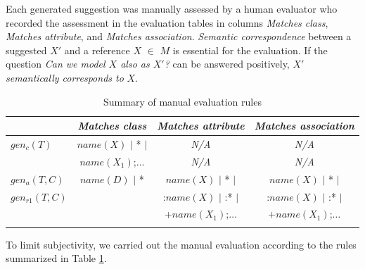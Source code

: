 Each generated suggestion was manually assessed by a human evaluator who recorded the assessment in the evaluation tables in columns \emph{Matches class}, \emph{Matches attribute}, and \emph{Matches association}.
\emph{Semantic correspondence} between a suggested $X'$ and a reference $X$ $\in$ $M$ is essential for the evaluation.
If the question \emph{Can we model $X$ also as $X'$?} can be answered positively, $X'$ \emph{semantically corresponds to} $X$.

\begin{table}[!h]
    \scriptsize
    \centering
    \setlength{\tabcolsep}{0.5em}
    \begin{tabular}{lccc}
                     & \emph{Matches class}        & \emph{Matches attribute} & \emph{Matches association} \\
\toprule
\addlinespace
        $gen_c(T)$   & $name(X)$ $\vert$ * $\vert$ & \emph{N/A}  & \emph{N/A} \\
                     & $name(X_1)$;$\ldots$        & \emph{N/A}  & \emph{N/A} \\
\addlinespace
\midrule
\addlinespace
        $gen_a(T,C)$ & $name(D)$ $\vert$ *         & $name(X)$ $\vert$ * $\vert$ & $name(X)$ $\vert$ * $\vert$ \\
        $gen_{r1}(T,C)$ &                             & :$name(X)$ $\vert$ :* $\vert$ & :$name(X)$ $\vert$ :* $\vert$ \\
                     &                             & +$name(X_1)$;$\ldots$        & +$name(X_1)$;$\ldots$ \\
\addlinespace
\bottomrule
    \end{tabular}
    \caption{Summary of manual evaluation rules}
    \label{tab:manual-assessment-of-suggestions}
\end{table}

To limit subjectivity, we carried out the manual evaluation according to the rules summarized in Table \ref{tab:manual-assessment-of-suggestions}.


